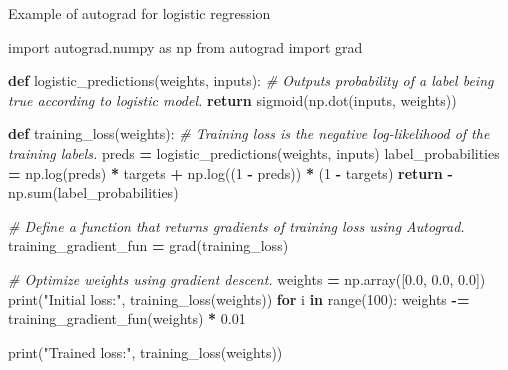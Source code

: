 \documentclass[ignorenonframetext,aspectratio=169]{beamer}
\newenvironment{Shaded}{\begin{snugshade}}{\end{snugshade}}
\newcommand{\BuiltInTok}[1]{#1}
\newcommand{\CommentTok}[1]{\textcolor[rgb]{0.56,0.35,0.01}{\textit{#1}}}
\newcommand{\ControlFlowTok}[1]{\textcolor[rgb]{0.13,0.29,0.53}{\textbf{#1}}}
\newcommand{\DecValTok}[1]{\textcolor[rgb]{0.00,0.00,0.81}{#1}}
\newcommand{\FloatTok}[1]{\textcolor[rgb]{0.00,0.00,0.81}{#1}}
\newcommand{\ImportTok}[1]{#1}
\newcommand{\KeywordTok}[1]{\textcolor[rgb]{0.13,0.29,0.53}{\textbf{#1}}}
\newcommand{\NormalTok}[1]{#1}
\newcommand{\OperatorTok}[1]{\textcolor[rgb]{0.81,0.36,0.00}{\textbf{#1}}}
\newcommand{\StringTok}[1]{\textcolor[rgb]{0.31,0.60,0.02}{#1}}
\begin{document}
\begin{frame}[fragile]{Example of autograd for logistic regression}
\protect\hypertarget{example-of-autograd-for-logistic-regression}{}

\tiny

\begin{Shaded}
\begin{Highlighting}[]
\ImportTok{import}\NormalTok{ autograd.numpy }\ImportTok{as}\NormalTok{ np}
\ImportTok{from}\NormalTok{ autograd }\ImportTok{import}\NormalTok{ grad}

\KeywordTok{def}\NormalTok{ logistic_predictions(weights, inputs):}
    \CommentTok{# Outputs probability of a label being true according to logistic model.}
    \ControlFlowTok{return}\NormalTok{ sigmoid(np.dot(inputs, weights))}

\KeywordTok{def}\NormalTok{ training_loss(weights):}
    \CommentTok{# Training loss is the negative log-likelihood of the training labels.}
\NormalTok{    preds }\OperatorTok{=}\NormalTok{ logistic_predictions(weights, inputs)}
\NormalTok{    label_probabilities }\OperatorTok{=}\NormalTok{ np.log(preds) }\OperatorTok{*}\NormalTok{ targets }\OperatorTok{+}\NormalTok{ np.log((}\DecValTok{1} \OperatorTok{-}\NormalTok{ preds)) }\OperatorTok{*}\NormalTok{ (}\DecValTok{1} \OperatorTok{-}\NormalTok{ targets)}
    \ControlFlowTok{return} \OperatorTok{-}\NormalTok{np.}\BuiltInTok{sum}\NormalTok{(label_probabilities)}

\CommentTok{# Define a function that returns gradients of training loss using Autograd.}
\NormalTok{training_gradient_fun }\OperatorTok{=}\NormalTok{ grad(training_loss)}

\CommentTok{# Optimize weights using gradient descent.}
\NormalTok{weights }\OperatorTok{=}\NormalTok{ np.array([}\FloatTok{0.0}\NormalTok{, }\FloatTok{0.0}\NormalTok{, }\FloatTok{0.0}\NormalTok{])}
\BuiltInTok{print}\NormalTok{(}\StringTok{"Initial loss:"}\NormalTok{, training_loss(weights))}
\ControlFlowTok{for}\NormalTok{ i }\KeywordTok{in} \BuiltInTok{range}\NormalTok{(}\DecValTok{100}\NormalTok{):}
\NormalTok{    weights }\OperatorTok{-=}\NormalTok{ training_gradient_fun(weights) }\OperatorTok{*} \FloatTok{0.01}

\BuiltInTok{print}\NormalTok{(}\StringTok{"Trained loss:"}\NormalTok{, training_loss(weights))}
\end{Highlighting}
\end{Shaded}

\end{frame}
\end{document}
